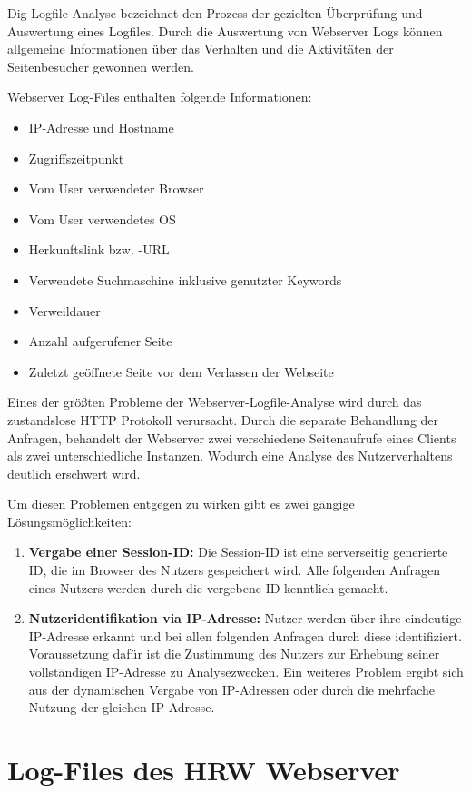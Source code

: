 Dig Logfile-Analyse bezeichnet den Prozess der gezielten Überprüfung und Auswertung eines Logfiles. Durch die Auswertung von Webserver Logs können allgemeine Informationen über das Verhalten und die Aktivitäten der Seitenbesucher gewonnen werden.

Webserver Log-Files enthalten folgende Informationen:

\begin{itemize}
\item IP-Adresse und Hostname
\item Zugriffszeitpunkt
\item Vom User verwendeter Browser
\item Vom User verwendetes OS
\item Herkunftslink bzw. -URL
\item Verwendete Suchmaschine inklusive genutzter Keywords
\item Verweildauer
\item Anzahl aufgerufener Seite
\item Zuletzt geöffnete Seite vor dem Verlassen der Webseite
\end{itemize}

Eines der größten Probleme der Webserver-Logfile-Analyse wird durch das zustandslose HTTP Protokoll verursacht. Durch die separate Behandlung der Anfragen, behandelt der Webserver zwei verschiedene Seitenaufrufe eines Clients als zwei unterschiedliche Instanzen. Wodurch eine Analyse des Nutzerverhaltens deutlich erschwert wird.

Um diesen Problemen entgegen zu wirken gibt es zwei gängige Lösungsmöglichkeiten:

\begin{enumerate}
\item \textbf{Vergabe einer Session-ID:} Die Session-ID ist eine serverseitig generierte ID, die im Browser des Nutzers gespeichert wird. Alle folgenden Anfragen eines Nutzers werden durch die vergebene ID kenntlich gemacht.
\item \textbf{Nutzeridentifikation via IP-Adresse:} Nutzer werden über ihre eindeutige IP-Adresse erkannt und bei allen folgenden Anfragen durch diese identifiziert. Voraussetzung dafür ist die Zustimmung des Nutzers zur Erhebung seiner vollständigen IP-Adresse zu Analysezwecken. Ein weiteres Problem ergibt sich aus der dynamischen Vergabe von IP-Adressen oder durch die mehrfache Nutzung der gleichen IP-Adresse. 
\end{enumerate} 

\section{Log-Files des HRW Webserver}
\label{sec:LogHRW}

